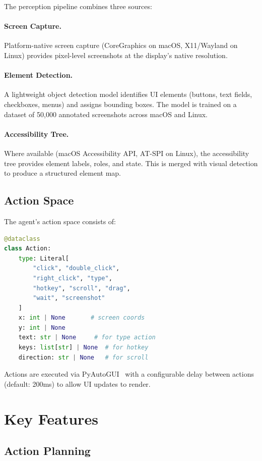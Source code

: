 \documentclass[11pt,twocolumn]{article}
\begin{document}
The perception pipeline combines three sources:

\paragraph{Screen Capture.} Platform-native screen capture (CoreGraphics on macOS, X11/Wayland on Linux) provides pixel-level screenshots at the display's native resolution.

\paragraph{Element Detection.} A lightweight object detection model identifies UI elements (buttons, text fields, checkboxes, menus) and assigns bounding boxes. The model is trained on a dataset of 50,000 annotated screenshots across macOS and Linux.

\paragraph{Accessibility Tree.} Where available (macOS Accessibility API, AT-SPI on Linux), the accessibility tree provides element labels, roles, and state. This is merged with visual detection to produce a structured element map.

\subsection{Action Space}

The agent's action space consists of:

\begin{lstlisting}[language=Python]
@dataclass
class Action:
    type: Literal[
        "click", "double_click",
        "right_click", "type",
        "hotkey", "scroll", "drag",
        "wait", "screenshot"
    ]
    x: int | None       # screen coords
    y: int | None
    text: str | None     # for type action
    keys: list[str] | None  # for hotkey
    direction: str | None   # for scroll
\end{lstlisting}

Actions are executed via PyAutoGUI~\cite{pyautogui} with a configurable delay between actions (default: 200ms) to allow UI updates to render.

\section{Key Features}

\subsection{Action Planning}
\end{document}
